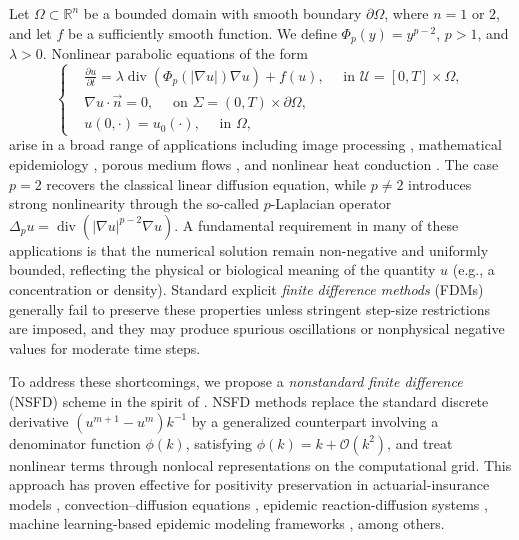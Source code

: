\documentclass[final,12pt,3p]{elsarticle}
\theoremstyle{plain}
\theoremstyle{definition}
\theoremstyle{remark}
\DeclareMathOperator{\diver}{div}
\begin{document}
Let $\Omega \subset \mathbb{R}^n$ be a bounded domain with smooth boundary $\partial\Omega$, where $n = 1$ or $2$, and let $f$ be a sufficiently smooth function.
We define $\Phi_p(y) = y^{p-2}$, $p > 1$, and $\lambda > 0$.
Nonlinear parabolic equations of the form
\begin{equation}\label{E1.1}
\left\{\begin{aligned}
& \frac{\partial u}{\partial t} = \lambda\diver(\Phi_p(|\nabla u|)\nabla u) + f(u), \quad \text { in } \mathcal{U} = [0, T] \times \Omega,\\ 
& \nabla u \cdot \vec{n}=0, \quad  \text { on } \Sigma = (0, T) \times \partial\Omega, \\ 
& u(0, \cdot) = u_0(\cdot), \quad  \text { in } \Omega,
\end{aligned}\right.
\end{equation}
arise in a broad range of applications including image processing \cite{Atlas2014}, mathematical epidemiology \cite{Zinihi2025FDE}, 
porous medium flows \cite{Vazquez2006}, and nonlinear heat conduction \cite{Lindqvist2019}.
The case $p = 2$ recovers the classical linear diffusion equation, while $p \ne2$ introduces strong nonlinearity through 
the so-called $p$-Laplacian operator $\Delta_p u = \diver(|\nabla u|^{p-2}\nabla u)$. 
A fundamental requirement in many of these applications is that the numerical solution remain non-negative and uniformly bounded, 
reflecting the physical or biological meaning of the quantity $u$ (e.g., a concentration or density). 
Standard explicit \textit{finite difference methods} (FDMs) generally fail to preserve these properties unless stringent step-size restrictions are imposed, 
and they may produce spurious oscillations or nonphysical negative values for moderate time steps.

To address these shortcomings, we propose a \textit{nonstandard finite difference} (NSFD) scheme in the spirit of \cite{Mickens1999, Mickens2006}. 
NSFD methods replace the standard discrete derivative $(u^{m+1}-u^m)k^{-1}$ by a generalized counterpart involving a denominator function $\phi(k)$, 
satisfying $\phi(k) = k + \mathcal{O}(k^2)$, and treat nonlinear terms through nonlocal representations on the computational grid. 
This approach has proven effective for positivity preservation in actuarial-insurance models \cite{Zinihi2026Actuarial}, 
convection–diffusion equations \cite{Ehrhardt2013}, epidemic reaction-diffusion systems \cite{Zinihi2025NSFD}, 
machine learning-based epidemic modeling frameworks \cite{Zinihi2026CA}, among others.
\end{document}
